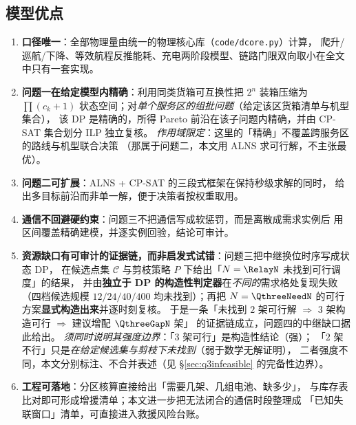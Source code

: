\documentclass[12pt,a4paper,fontset=windows]{ctexart}
\begin{document}
\subsection{模型优点}
\begin{enumerate}[leftmargin=2.2em,itemsep=2pt]
\item \textbf{口径唯一}：全部物理量由统一的物理核心库（\texttt{code/dcore.py}）计算，
  爬升/巡航/下降、等效航程反推能耗、充电两阶段模型、链路门限双向取小在全文中只有一套实现。
\item \textbf{问题一在给定模型内精确}：利用同类货箱可互换性把 $2^{n}$ 装箱压缩为
  $\prod(c_k+1)$ 状态空间；对\emph{单个服务区的组批问题}（给定该区货箱清单与机型集合），
  该 DP 是精确的，所得 Pareto 前沿在该子问题内精确，并由 CP-SAT 集合划分 ILP 独立复核。
  \emph{作用域限定}：这里的「精确」不覆盖跨服务区的路线与机型联合决策
  （那属于问题二，本文用 ALNS 求可行解，不主张最优）。
\item \textbf{问题二可扩展}：ALNS + CP-SAT 的三段式框架在保持秒级求解的同时，
  给出多目标前沿而非单一解，便于决策者按权重取用。
\item \textbf{通信不回避硬约束}：问题三不把通信写成软惩罚，而是离散成需求实例后
  用区间覆盖精确建模，并逐实例回验，结论可审计。
\item \textbf{资源缺口有可审计的证据链，而非启发式试错}：问题三把中继换位时序写成状态 DP，
  在候选点集 $\mathcal{C}$ 与剪枝策略 $P$ 下给出「$N=\RelayN$ 未找到可行调度」的结果，
  并由\textbf{独立于 DP 的构造性判定器}在\emph{不同的}需求格处复现失败（四档候选规模
  $12/24/40/400$ 均未找到）；再把 $N=\QthreeNeedN$ 的可行方案\textbf{显式构造出来}并逐时刻复核。
  于是一条「未找到 $2$ 架可行解 $\Rightarrow$ $3$ 架构造可行 $\Rightarrow$ 建议增配 $\QthreeGapN$ 架」
  的证据链成立，问题四的中继缺口据此给出。
  \emph{须同时说明其强度边界}：「$3$ 架可行」是构造性结论（强）；
  「$2$ 架不行」只是\emph{在给定候选集与剪枝下未找到}（弱于数学无解证明），
  二者强度不同，本文分别标注、不合并表述（见 \S\ref{sec:q3infeasible} 的完备性边界）。
\item \textbf{工程可落地}：分区核算直接给出「需要几架、几组电池、缺多少」，
  与库存表比对即可形成增援清单；本文进一步把无法闭合的通信时段整理成
  「已知失联窗口」清单，可直接进入救援风险台账。
\end{enumerate}
\end{document}
